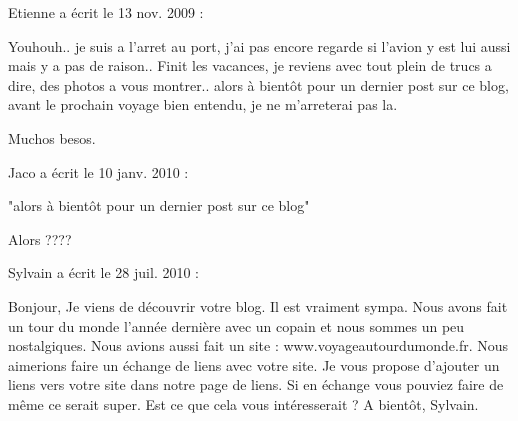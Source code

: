 \medskip
Etienne a écrit le 13 nov. 2009 :
\begin{displayquote}
Youhouh.. je suis a l'arret au port, j'ai pas encore regarde si l'avion y est lui aussi mais y a pas de raison..
Finit les vacances, je reviens avec tout plein de trucs a dire, des photos a vous montrer.. alors à bientôt pour un dernier post sur ce blog, avant le prochain voyage bien entendu, je ne m'arreterai pas la.

Muchos besos.
\end{displayquote}

\medskip
Jaco a écrit le 10 janv. 2010 :
\begin{displayquote}
"alors à bientôt pour un dernier post sur ce blog"

Alors ????
\end{displayquote}

\medskip
Sylvain a écrit le 28 juil. 2010 :
\begin{displayquote}
Bonjour,
Je viens de découvrir votre blog. Il est vraiment sympa. Nous avons fait un tour du monde l'année dernière avec un copain et nous sommes un peu nostalgiques.
Nous avions aussi fait un site : www.voyageautourdumonde.fr. Nous aimerions faire un échange de liens avec votre site. Je vous propose d'ajouter un liens vers votre site dans notre page de liens. Si en échange vous pouviez faire de même ce serait super.
Est ce que cela vous intéresserait ?
A bientôt,
Sylvain.
\end{displayquote}

\vfill
